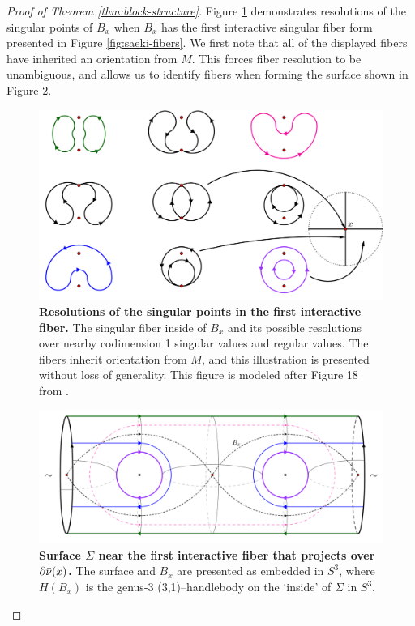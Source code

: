 \begin{proof}[Proof of Theorem \ref{thm:block-structure}]
	Figure \ref{fig:codim-2-interactive-fiber-1} demonstrates resolutions of the singular points of $B_x$ when $B_x$ has the first interactive singular fiber form presented in Figure \ref{fig:saeki-fibers}.
	We first note that all of the displayed fibers have inherited an orientation from $M$.
	This forces fiber resolution to be unambiguous, and allows us to identify fibers when forming the surface shown in Figure \ref{fig:codim-2-surface-1}.
	
	\begin{figure}[h]
		\centering
		\includegraphics[width=\textwidth]{figures/codim-2-interactive-fiber-1.png}
		\caption{
			\textbf{Resolutions of the singular points in the first interactive fiber.}
			The singular fiber inside of $B_x$ and its possible resolutions over nearby codimension 1 singular values and regular values.
			The fibers inherit orientation from $M$, and this illustration is presented without loss of generality.
			This figure is modeled after Figure 18 from \cite{CostThur08}.
		}
		\label{fig:codim-2-interactive-fiber-1}
	\end{figure}

	\begin{figure}[h]
	\centering
	\includegraphics[width=\textwidth]{figures/codim-2-surface-1.png}
	\caption{
		\textbf{Surface $\Sigma$ near the first interactive fiber that projects over $\partial\bar\nu(x)$.}
		The surface and $B_x$ are presented as embedded in $S^3$, where $H(B_x)$ is the genus-3 (3,1)--handlebody on the `inside' of $\Sigma$ in $S^3$.
	}
	\label{fig:codim-2-surface-1}
	\end{figure}


\end{proof}
